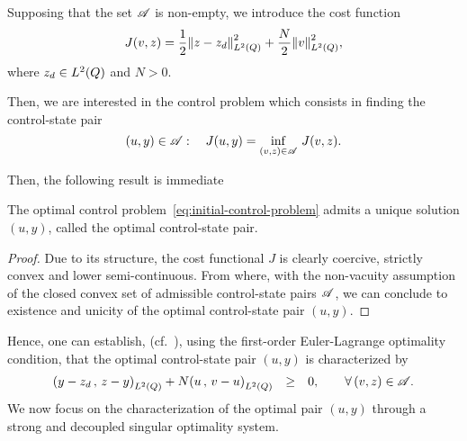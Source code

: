 Supposing that the set $\mathscr{A}$ is non-empty, we introduce the cost function
\begin{equation}\label{eq:initial-cost-function}
    J(v,z) = \dfrac{1}{2}{\left\|{z - z_{d} }\right\|}_{L^{2}\left({Q}\right)}^{2} + \dfrac{N}{2}{\left\|{v }\right\|}_{L^{2}\left({Q}\right)}^{2},
\end{equation}
where $z_{d}\in L^{2}\!\left({Q}\right)$ and $N > 0$.

Then, we are interested in the control problem which consists in finding
the control-state pair
\begin{equation}\label{eq:initial-control-problem}
    (u,y)\in\mathscr{A}:\quad J(u,y) = \inf_{(v,z)\in \mathscr{A}}\,J(v,z).
\end{equation}

Then, the following result is immediate
\begin{theoreme}%
    The optimal control problem~\eqref{eq:initial-control-problem} admits a
    unique solution $(u,y)$, called the optimal control-state pair.
\end{theoreme}

\begin{proof}%
    Due to its structure, the cost functional $J$ is clearly coercive,
    strictly convex and lower semi-continuous. From where, with the
    non-vacuity assumption of the closed convex set of admissible
    control-state pairs $\mathscr{A}$, we can conclude to existence and unicity
    of the optimal control-state pair $(u,y)$.
\end{proof}

Hence, one can establish, (cf.~\cite{lions2}), using the first-order
Euler-Lagrange optimality condition, that the optimal control-state pair
$(u,y)$ is characterized by
\begin{equation*}\label{eq:initial-variational-inequation}
    \begin{array}{rcl}
        \scalaireq{%
            y - z_{d}
        }{%
            z - y
        } + N\scalaireq{u}{v - u} & \geq & 0,\qquad \forall\,(v,z)\in\Ascr.
    \end{array}
\end{equation*}
We now focus on the characterization of the optimal pair $(u,y)$ through a
strong and decoupled singular optimality system.

